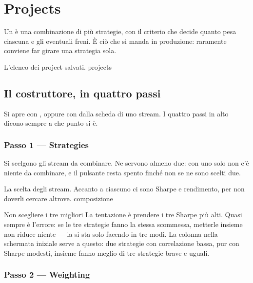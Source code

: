 \chapter{Projects}\label{cap:projects}

Un  è una combinazione di più strategie, con il criterio che
decide quanto pesa ciascuna e gli eventuali freni. È ciò che si manda in
produzione: raramente conviene far girare una strategia sola.

  {L'elenco dei project salvati.}
  {projects}

\section{Il costruttore, in quattro passi}\label{sez:costruttore}

Si apre con , oppure con  dalla scheda di uno stream. I quattro passi in alto dicono sempre
a che punto si è.

\subsection{Passo 1 --- Strategies}

Si scelgono gli stream da combinare. Ne servono almeno due: con uno solo non
c'è niente da combinare, e il pulsante  resta spento finché
non se ne sono scelti due.

  {La scelta degli stream. Accanto a ciascuno ci sono Sharpe e rendimento,
   per non doverli cercare altrove.}
  {composizione}

\begin{perche}{Non scegliere i tre migliori}
La tentazione è prendere i tre Sharpe più alti. Quasi sempre è l'errore: se
le tre strategie fanno la stessa scommessa, metterle insieme non riduce
niente --- la si sta solo facendo in tre modi. La colonna  nella
schermata iniziale serve a questo: due strategie con correlazione bassa, pur
con Sharpe modesti, insieme fanno meglio di tre strategie brave e uguali.
\end{perche}

\subsection{Passo 2 --- Weighting}

